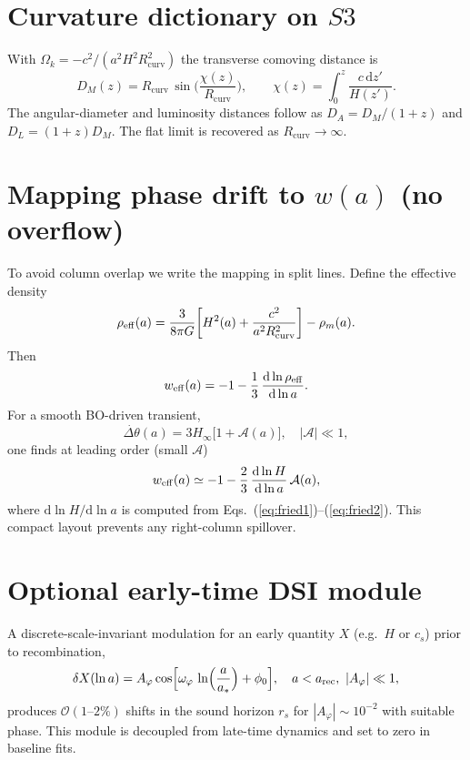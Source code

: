 \documentclass[twocolumn,aps,prd,showpacs,nofootinbib,superscriptaddress]{revtex4-2}
\def\Sthree{S3}%
\newcommand{\phig}{\varphi}
\newcommand{\Sthree}{S^{3}}
\newcommand{\Omk}{\Omega_k}
\newcommand{\dd}{\mathrm{d}}
\newcommand{\Rcurv}{R_{\mathrm{curv}}}
\begin{document}
\section{Curvature dictionary on $\Sthree$}
\label{app:curv}
With $\Omk=-c^2/(a^2H^2\Rcurv^2)$ the transverse comoving distance is
\begin{equation}
D_M(z)=\Rcurv\,\sin\!\Big(\frac{\chi(z)}{\Rcurv}\Big),\qquad
\chi(z)=\int_0^z\!\frac{c\,\dd z'}{H(z')}.
\end{equation}
The angular-diameter and luminosity distances follow as $D_A=D_M/(1+z)$ and $D_L=(1+z)D_M$. The flat limit is recovered as $\Rcurv\to\infty$.

\section{Mapping phase drift to $w(a)$ (no overflow)}
\label{app:map}
To avoid column overlap we write the mapping in split lines.
Define the effective density
\begin{equation}
\rho_{\rm eff}(a)
=\frac{3}{8\pi G}\!\left[
H^2(a)
+\frac{c^2}{a^2\Rcurv^2}
\right]-\rho_m(a).
\end{equation}
Then
\begin{equation}
w_{\rm eff}(a)
= -1
-\frac{1}{3}\,\frac{\dd\ln\rho_{\rm eff}}{\dd\ln a}.
\end{equation}
For a smooth BO-driven transient,
\begin{equation}
\dot{\Delta\theta}(a)
= 3H_\infty\Big[1+\mathcal{A}(a)\Big],
\quad
|\mathcal{A}|\ll 1,
\end{equation}
one finds at leading order (small $\mathcal{A}$)
\begin{equation}
w_{\rm eff}(a)
\simeq -1
-\frac{2}{3}\,
\frac{\dd\ln H}{\dd\ln a}\,
\mathcal{A}(a),
\end{equation}
where $\dd\ln H/\dd\ln a$ is computed from Eqs.~(\ref{eq:fried1})--(\ref{eq:fried2}). 
This compact layout prevents any right-column spillover.

\section{Optional early-time DSI module}
\label{app:dsi}
A discrete-scale-invariant modulation for an early quantity $X$ (e.g.\ $H$ or $c_s$) prior to recombination,
\begin{equation}
\delta X(\ln a)=A_\phig\cos\!\Big[\omega_\phig\,\ln\!\Big(\frac{a}{a_\ast}\Big)+\phi_0\Big],
\quad a<a_{\rm rec},\ |A_\phig|\ll1,
\end{equation}
produces $\mathcal{O}(1\text{--}2\%)$ shifts in the sound horizon $r_s$ for $|A_\phig|\sim10^{-2}$ with suitable phase. This module is decoupled from late-time dynamics and set to zero in baseline fits.
\end{document}

